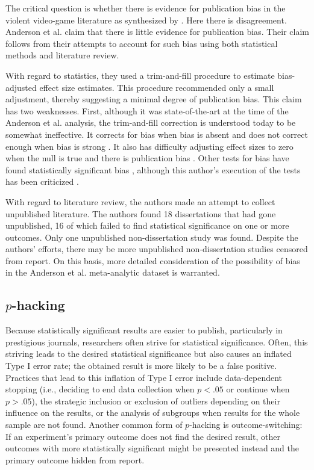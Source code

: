 \documentclass[man, mask]{apa6}
\begin{document}
The critical question is whether there is evidence for publication bias in the violent video-game literature as synthesized by \citet{Anderson:etal:2010}.  Here there is disagreement.  Anderson et al. claim that there is little evidence for publication bias.  Their claim follows from their attempts to account for such bias using both statistical methods and literature review.  

With regard to statistics, they used a  trim-and-fill procedure to estimate bias-adjusted effect size estimates. This procedure recommended only a small adjustment, thereby suggesting a minimal degree of publication bias. This claim has two weaknesses. First, although it was state-of-the-art at the time of the Anderson et al. analysis, the trim-and-fill correction is understood today to be somewhat ineffective. It corrects for bias when bias is absent and does not correct enough when bias is strong \citep{Simonsohn:etal:2014b}. It also has difficulty adjusting effect sizes to zero when the null is true and there is publication bias \citep{Moreno:etal:2009}. Other tests for bias have found statistically significant  bias \citep{Ferguson:2007}, although this author's execution of the tests has been criticized \citep[see][]{Anderson:etal:2010}. 

With regard to literature review, the authors made an attempt to collect unpublished literature. The authors found 18 dissertations that had gone unpublished, 16 of which failed to find statistical significance on one or more outcomes. Only one unpublished non-dissertation study was found. Despite the authors' efforts, there may be more unpublished non-dissertation studies censored from report. On this basis, more detailed consideration of the possibility of bias in the Anderson et al. meta-analytic dataset is warranted.

\subsection{$p$-hacking}
Because statistically significant results are easier to publish, particularly in prestigious journals, researchers often strive for statistical significance. Often, this striving leads to the desired statistical significance but also causes an inflated Type I error rate; the obtained result is more likely to be a false positive. Practices that lead to this inflation of Type I error include data-dependent stopping (i.e., deciding to end data collection when $p < .05$ or continue when $p > .05$), the strategic inclusion or exclusion of outliers depending on their influence on the results, or the analysis of subgroups when results for the whole sample are not found. Another common form of $p$-hacking is outcome-switching: If an experiment's primary outcome does not find the desired result, other outcomes with more statistically significant might be presented instead and the primary outcome hidden from report.
\end{document}
